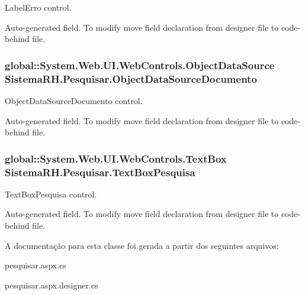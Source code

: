 LabelErro control. 

Auto-\/generated field. To modify move field declaration from designer file to code-\/behind file. \hypertarget{class_sistema_r_h_1_1_pesquisar_a6e9ec0cf29ddddee97dc6be2a836e397}{
\subsubsection[{ObjectDataSourceDocumento}]{\setlength{\rightskip}{0pt plus 5cm}global::System.Web.UI.WebControls.ObjectDataSource {\bf SistemaRH.Pesquisar.ObjectDataSourceDocumento}}}
\label{class_sistema_r_h_1_1_pesquisar_a6e9ec0cf29ddddee97dc6be2a836e397}


ObjectDataSourceDocumento control. 

Auto-\/generated field. To modify move field declaration from designer file to code-\/behind file. \hypertarget{class_sistema_r_h_1_1_pesquisar_ad167e10b78a58d8192c25cb0125dc20d}{
\subsubsection[{TextBoxPesquisa}]{\setlength{\rightskip}{0pt plus 5cm}global::System.Web.UI.WebControls.TextBox {\bf SistemaRH.Pesquisar.TextBoxPesquisa}}}
\label{class_sistema_r_h_1_1_pesquisar_ad167e10b78a58d8192c25cb0125dc20d}


TextBoxPesquisa control. 

Auto-\/generated field. To modify move field declaration from designer file to code-\/behind file. 

A documentação para esta classe foi gerada a partir dos seguintes arquivos:\begin{DoxyCompactItemize}
\item 
pesquisar.aspx.cs\item 
pesquisar.aspx.designer.cs\end{DoxyCompactItemize}
